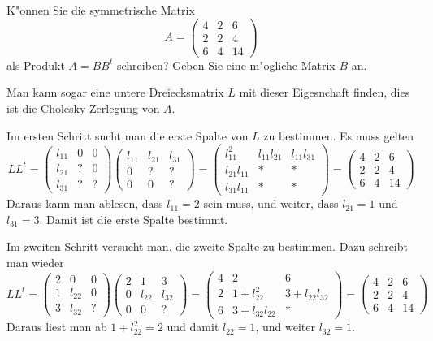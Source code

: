 K"onnen Sie die symmetrische Matrix
\[
A=\begin{pmatrix}
    4&   2&   6\\
    2&   2&   4\\
    6&   4&  14
\end{pmatrix}
\]
als Produkt $A=BB^t$ schreiben? Geben Sie eine m"ogliche Matrix $B$ an.

\begin{loesung}
Man kann sogar eine untere Dreiecksmatrix $L$ mit dieser Eigesnchaft finden,
dies ist die Cholesky-Zerlegung von $A$.

Im ersten Schritt sucht man die erste Spalte von $L$ zu bestimmen.
Es muss gelten
\[
LL^t=
\begin{pmatrix}
l_{11}&  0&  0\\
l_{21}&  ?&  0\\
l_{31}&  ?&  ?
\end{pmatrix}
\begin{pmatrix}
l_{11}&l_{21}&l_{31}\\
     0&     ?&     ?\\
     0&     0&     ?
\end{pmatrix}
=
\begin{pmatrix}
    l_{11}^2&l_{11}l_{21}&l_{11}l_{31}\\
l_{21}l_{11}&           *&           *\\
l_{31}l_{11}&           *&           *
\end{pmatrix}
=
\begin{pmatrix}
    4&   2&   6\\
    2&   2&   4\\
    6&   4&  14
\end{pmatrix}
\]
Daraus kann man ablesen, dass $l_{11}=2$ sein muss, und weiter,
dass
$l_{21}=1$ und $l_{31}=3$. Damit ist die erste Spalte bestimmt.

Im zweiten Schritt versucht man, die zweite Spalte zu bestimmen.
Dazu schreibt man wieder
\[
LL^t
=
\begin{pmatrix}
2&     0&0\\
1&l_{22}&0\\
3&l_{32}&?
\end{pmatrix}
\begin{pmatrix}
2&     1&     3\\
0&l_{22}&l_{32}\\
0&     0&?
\end{pmatrix}
=
\begin{pmatrix}
4&2           &           6\\
2&1+l_{22}^2  &3+l_{22}l_{32}\\
6&3+l_{32}l_{22}&         *
\end{pmatrix}
=
\begin{pmatrix}
    4&   2&   6\\
    2&   2&   4\\
    6&   4&  14
\end{pmatrix}
\]
Daraus liest man ab $1+l_{22}^2=2$ und damit $l_{22}=1$, und weiter
$l_{32}=1$.


\end{loesung}
